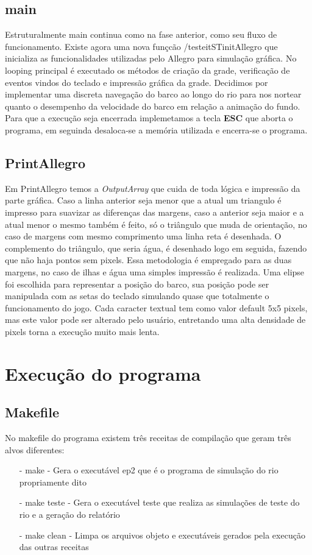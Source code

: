 \documentclass[a4paper,11pt]{article}
\begin{document}
\subsection{main}
Estruturalmente main continua como na fase anterior, como seu fluxo de funcionamento. Existe agora uma nova funçcão /testeit{STinitAllegro} que inicializa as funcionalidades utilizadas pelo Allegro para simulação gráfica. No looping principal é executado os métodos de criação da grade, verificação de eventos vindos do teclado e impressão gráfica da grade. Decidimos por implementar uma discreta navegação do barco ao longo do rio para nos nortear quanto o desempenho da velocidade do barco em relação a animação do fundo. Para que a execução seja encerrada implemetamos a tecla \textbf{ESC} que aborta o programa, em seguinda desaloca-se a memória utilizada e encerra-se o programa.
\subsection{PrintAllegro}
Em PrintAllegro temos a \textit{OutputArray} que cuida de toda lógica e impressão da parte gráfica. Caso a linha anterior seja menor que a atual um triangulo é impresso para suavizar as diferenças das margens, caso a anterior seja maior e a atual menor o mesmo também é feito, só o triângulo que muda de orientação, no caso de margens com mesmo comprimento uma linha reta é desenhada. O complemento do triângulo, que seria água, é desenhado logo em seguida, fazendo que não haja pontos sem pixels. Essa metodologia é empregado para as duas margens, no caso de ilhas e água uma simples impressão é realizada.
Uma elipse foi escolhida para representar a posição do barco, sua posição pode ser manipulada com as setas do teclado simulando quase que totalmente o funcionamento do jogo. Cada caracter textual tem como valor default 5x5 pixels, mas este valor pode ser alterado pelo usuário, entretando uma alta densidade de pixels torna a execução muito mais lenta.

\section{Execu\c{c}ão do programa}
\subsection{Makefile}
No makefile do programa existem três receitas de compila\c{c}ão que geram três alvos diferentes:
\begin{enumerate}
\item[-]{make - Gera o executável ep2 que é o programa de simula\c{c}ão do rio propriamente dito}
\item[-]{make teste - Gera o executável teste que realiza as simula\c{c}ões de teste do rio e a gera\c{c}ão do relatório}
\item[-]{make clean - Limpa os arquivos objeto e executáveis gerados pela execu\c{c}ão das outras receitas}
\end{enumerate}
\end{document}
